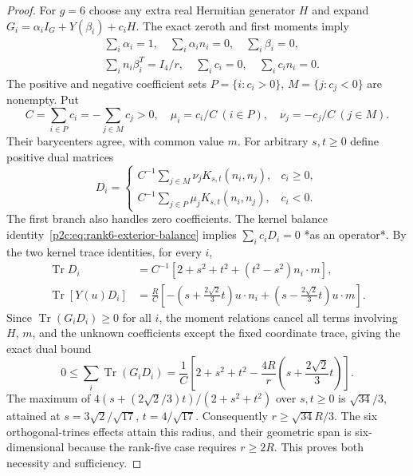 \documentclass[12pt,a4paper]{article}
\begin{document}
\begin{proof}
For $g=6$ choose any extra real Hermitian generator $H$ and expand
$G_i=\alpha_iI_G+Y(\beta_i)+c_iH$.
The exact zeroth and first moments imply
\[
\begin{aligned}
 &\sum_i\alpha_i=1,\quad \sum_i\alpha_in_i=0,\quad \sum_i\beta_i=0,\\
 &\sum_i n_i\beta_i^{T}=I_4/r,\quad \sum_ic_i=0,\quad \sum_ic_in_i=0.
\end{aligned}
\]
The positive and negative coefficient sets
$P=\{i:c_i>0\}$, $M=\{j:c_j<0\}$ are nonempty. Put
\[
 C=\sum_{i\in P}c_i=-\sum_{j\in M}c_j>0,\quad
 \mu_i=c_i/C\ (i\in P),\quad \nu_j=-c_j/C\ (j\in M).
\]
Their barycenters agree, with common value $m$.
For arbitrary $s,t\ge0$ define positive dual matrices
\[
 D_i=\begin{cases}
 C^{-1}\sum_{j\in M}\nu_j K_{s,t}(n_i,n_j),&c_i\ge0,\\
 C^{-1}\sum_{j\in P}\mu_j K_{s,t}(n_i,n_j),&c_i<0.
 \end{cases}
\]
The first branch also handles zero coefficients. The kernel balance
identity~\eqref{p2c:eq:rank6-exterior-balance} implies
$\sum_ic_iD_i=0$ *as an operator*.
By the two kernel trace identities, for every $i$,
\begin{align*}
 \operatorname{Tr}D_i&=C^{-1}\left[2+s^2+t^2+(t^2-s^2)n_i\cdot m\right],\\
 \operatorname{Tr}[Y(u)D_i]&=\frac RC\left[
 -\left(s+\frac{2\sqrt2}{3}t\right)u\cdot n_i
 +\left(s-\frac{2\sqrt2}{3}t\right)u\cdot m\right].
\end{align*}
Since $\operatorname{Tr}(G_iD_i)\ge0$ for all $i$, the moment relations
cancel all terms involving $H$, $m$, and the unknown coefficients except
the fixed coordinate trace, giving the exact dual bound
\[
 0\le\sum_i\operatorname{Tr}(G_iD_i)
 =\frac1C\left[2+s^2+t^2
 -\frac{4R}{r}\left(s+\frac{2\sqrt2}{3}t\right)\right].
\]
The maximum of
$4(s+(2\sqrt2/3)t)/(2+s^2+t^2)$ over $s,t\ge0$ is
$\sqrt{34}/3$, attained at
$s=3\sqrt2/\sqrt{17}$, $t=4/\sqrt{17}$.
Consequently $r\ge\sqrt{34}R/3$. The six orthogonal-trines effects
attain this radius, and their geometric span is six-dimensional because
the rank-five case requires $r\ge2R$. This proves both necessity
and sufficiency. 
\end{proof}
\end{document}
